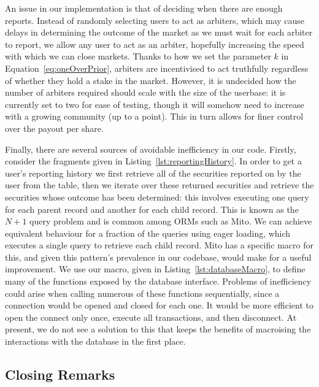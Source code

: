 An issue in our implementation is that of deciding when there are enough
reports. Instead of randomly selecting users to act as arbiters, which may
cause delays in determining the outcome of the market as we must wait for each
arbiter to report, we allow any user to act as an arbiter, hopefully increasing
the speed with which we can close markets. Thanks to how we set the parameter
$k$ in Equation~\ref{eq:oneOverPrior}, arbiters are incentivised to act
truthfully regardless of whether they hold a stake in the market. However, it
is undecided how the number of arbiters required should scale with the size of
the userbase: it is currently set to two for ease of testing, though it will
somehow need to increase with a growing community (up to a point). This in turn
allows for finer control over the payout per share.

Finally, there are several sources of avoidable inefficiency in our code.
Firstly, consider the fragments given in Listing~\ref{lst:reportingHistory}.
In order to get a user's reporting history we first retrieve all of the
securities reported on by the user from the  table, then we
iterate over these returned securities and retrieve the securities whose
outcome has been determined: this involves executing one query for each parent
record and another for each child record. This is known as the $N+1$ query
problem and is common among ORMs such as Mito. We can achieve equivalent
behaviour for a fraction of the queries using eager loading, which executes a
single query to retrieve each child record. Mito has a specific macro for this,
and given this pattern's prevalence in our codebase, would make for a useful
improvement. We use our  macro, given in
Listing~\ref{lst:databaseMacro}, to define many of the functions exposed by the
database interface. Problems of inefficiency could arise when calling numerous
of these functions sequentially, since a connection would be opened and closed
for each one. It would be more efficient to open the connect only once, execute
all transactions, and then disconnect. At present, we do not see a solution to
this that keeps the benefits of macroising the interactions with the database
in the first place.

\subsection{Closing Remarks}

